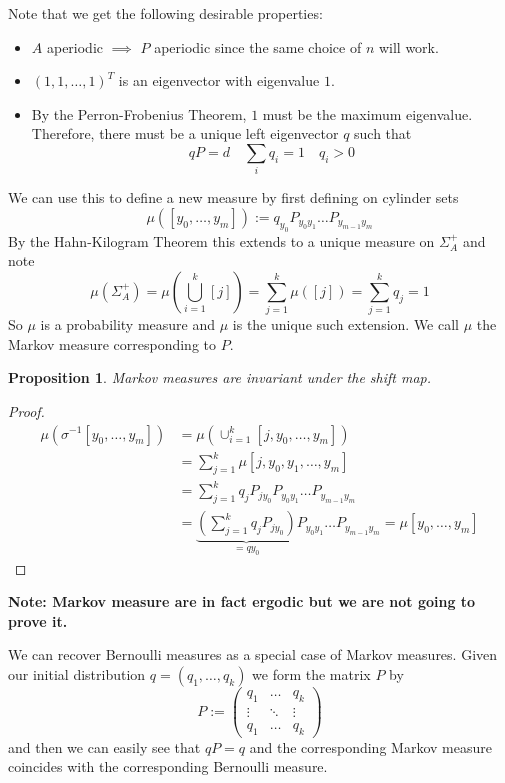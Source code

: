 \documentclass[11pt]{article}
\newcommand{\defeq}{:=}
\newcommand{\mdf}[1]{{\color{red} #1}}
\newenvironment{note}
	{\begin{mdframed}[backgroundcolor=white, linecolor=red, roundcorner=5pt, linewidth=1pt]\bfseries{Note:}\normalfont}
	{\end{mdframed}}
\newtheorem{prop}{Proposition}[section]
\begin{document}
Note that we get the following desirable properties:
\begin{itemize}
	\item $A$ aperiodic $\implies$ $P$ aperiodic since the same choice of $n$ will work.
	\item $(1, 1, \dots, 1)^T$ is an eigenvector with eigenvalue $1$.
	\item By the Perron-Frobenius Theorem, $1$ must be the maximum eigenvalue.
		Therefore, there must be a unique left eigenvector $q$ such that
		\[
			qP = d \quad \sum_{i}q_i = 1\quad q_i >0
		\]
\end{itemize}
We can use this to define a new measure by first defining on cylinder sets
\[
	\mu(\left[ y_0, \dots, y_m \right]) \defeq q_{y_0}P_{y_0 y_1}\dots P_{y_{m-1}y_m}
\]
By the Hahn-Kilogram Theorem this extends to a unique measure on $\Sigma_A^+$ and note
\[
	\mu(\Sigma_A^+)=\mu\left( \bigcup_{i=1}^k [j] \right)=\sum_{j=1}^k \mu( \left[ j\right]) = \sum_{j=1}^k q_j =1
\]
So $\mu$ is a probability measure and $\mu$ is the unique such extension.
We call $\mu$ the \mdf{Markov measure corresponding to $P$}.

\begin{prop}
Markov measures are invariant under the shift map.
\end{prop}

\begin{proof}
\begin{align*}
	\mu(\sigma^{-1}[y_0, \dots, y_m]) &= \mu\left( \cup_{i=1}^k [j, y_0, \dots, y_m]\right) \\
									  &= \sum_{j=1}^k\mu[j, y_0, y_1, \dots, y_m] \\
									  &= \sum_{j=1}^k q_jP_{j y_0} P_{y_0 y_1} \dots P_{y_{m-1} y_m} \\
									  &= \underbrace{\left( \sum_{j=1}^k q_j P_{j y_0}\right)}_{=qy_0}P_{y_0 y_1} \dots P_{y_{m-1} y_m}
									  = \mu[y_0, \dots, y_m]
\end{align*}
\end{proof}

\begin{note}
Markov measure are in fact ergodic but we are not going to prove it.
\end{note}

We can recover Bernoulli measures as a special case of Markov measures.
Given our initial distribution $q=(q_1, \dots, q_k)$ we form the matrix $P$ by
\[
P\defeq
\begin{pmatrix}
	q_1 & \dots & q_k \\
	\vdots & \ddots & \vdots \\
	q_1 & \dots & q_k
\end{pmatrix}
\]
and then we can easily see that $qP=q$ and the corresponding Markov measure coincides with the corresponding Bernoulli measure.
\end{document}
